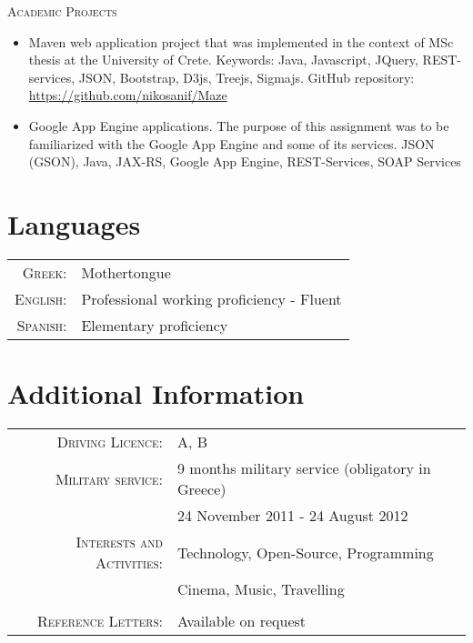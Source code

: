 \documentclass[11pt]{article}
\begin{document}
\textsc{Academic Projects}
\begin{itemize}
\item
Maven web application project that was implemented in the context of MSc thesis at the University of Crete. Keywords: Java, Javascript, JQuery, REST-services, JSON, Bootstrap, D3js, Treejs, Sigmajs. GitHub repository: \url{https://github.com/nikosanif/Maze}
\item
Google App Engine applications. The purpose of this assignment was to be familiarized with the Google App Engine and some of its services. JSON (GSON), Java, JAX-RS, Google App Engine, REST-Services, SOAP Services
\end{itemize}

\section{Languages}
\begin{tabular}{rl}
\textsc{Greek:}&Mothertongue\\
\textsc{English:}& Professional working proficiency - Fluent\\
\textsc{Spanish:}& Elementary proficiency\\
\end{tabular}


\section{Additional Information}
\begin{tabular}{rl}
\textsc{Driving Licence:} & A, B\\
\textsc{Military service:} & 9 months military service (obligatory in Greece)\\ 
& 24 November 2011 - 24 August 2012\\
\textsc{Interests and Activities:} & Technology, Open-Source, Programming\\
& Cinema, Music, Travelling\\
&\\
\textsc{Reference Letters:} & Available on request
\end{tabular}
\end{document}
